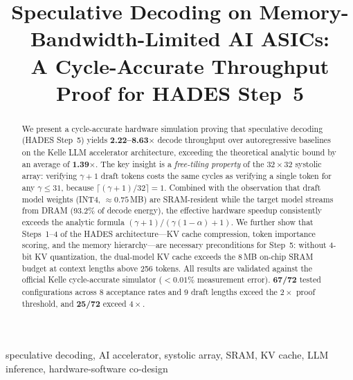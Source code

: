 \documentclass[conference]{IEEEtran}
\begin{document}
\title{Speculative Decoding on Memory-Bandwidth-Limited AI ASICs:\\
A Cycle-Accurate Throughput Proof for HADES Step~5}

\author{%
}

\maketitle

\begin{abstract}
We present a cycle-accurate hardware simulation proving that speculative
decoding (HADES Step~5) yields \textbf{2.22--8.63$\times$} decode throughput over
autoregressive baselines on the Kelle LLM accelerator architecture, exceeding
the theoretical analytic bound by an average of \textbf{1.39$\times$}.
The key insight is a \emph{free-tiling property} of the $32{\times}32$
systolic array: verifying $\gamma{+}1$ draft tokens costs the same cycles as
verifying a single token for any $\gamma \le 31$, because
$\lceil(\gamma{+}1)/32\rceil = 1$.
Combined with the observation that draft model weights (INT4, ${\approx}0.75$\,MB)
are SRAM-resident while the target model streams from DRAM (93.2\% of decode
energy), the effective hardware speedup consistently exceeds the analytic formula
$(\gamma{+}1)/(\gamma(1{-}\alpha)+1)$.
We further show that Steps~1--4 of the HADES architecture---KV cache
compression, token importance scoring, and the memory hierarchy---are necessary
preconditions for Step~5: without 4-bit KV quantization, the dual-model KV
cache exceeds the 8\,MB on-chip SRAM budget at context lengths above 256
tokens.
All results are validated against the official Kelle cycle-accurate simulator
($<0.01\%$ measurement error).
\textbf{67/72} tested configurations across 8 acceptance rates and 9 draft
lengths exceed the $2\times$ proof threshold, and \textbf{25/72} exceed
$4\times$.
\end{abstract}

\begin{IEEEkeywords}
speculative decoding, AI accelerator, systolic array, SRAM, KV cache,
LLM inference, hardware-software co-design
\end{IEEEkeywords}
\end{document}
